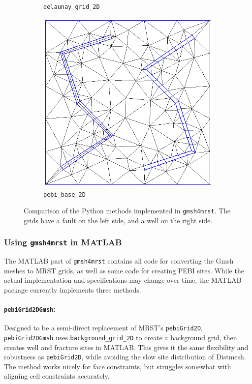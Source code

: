 \begin{figure}[p]
\begin{subfigure}[b]{0.49\textwidth}
        \caption{\texttt{delaunay\_grid\_2D}}
        \label{fig:delaunay_grid_2D}
    \end{subfigure}
    \begin{subfigure}[b]{0.49\textwidth}
        \centering
        \includegraphics[width=\textwidth]{report/Images/Combining software/Demo gmsh4mrst/demo_pebi_base_2D_lines.png}
        \caption{\texttt{pebi\_base\_2D}}
        \label{fig:pebi_base_2D}
    \end{subfigure}
    \caption[Comparison of the Python methods implemented in \texttt{gmsh4mrst}]{Comparison of the Python methods implemented in \texttt{gmsh4mrst}. The grids have a fault on the left side, and a well on the right side.}
    \label{fig:gmsh4mrst-pymethods}
\end{figure}

\subsubsection{Using \texttt{gmsh4mrst} in MATLAB}
The MATLAB part of \verb|gmsh4mrst| contains all code for converting the Gmsh meshes to MRST grids, as well as some code for creating PEBI sites. While the actual implementation and specifications may change over time, the MATLAB package currently implements three methods. 

\paragraph{\texttt{pebiGrid2DGmsh}:}
Designed to be a semi-direct replacement of MRST's \verb|pebiGrid2D|, \verb|pebiGrid2DGmsh| uses \verb|background_grid_2D| to create a background grid, then creates well and fracture sites in MATLAB. This gives it the same flexibility and robustness as \verb|pebiGrid2D|, while avoiding the slow site distribution of Distmesh. The method works nicely for face constraints, but struggles somewhat with aligning cell constraints accurately.

